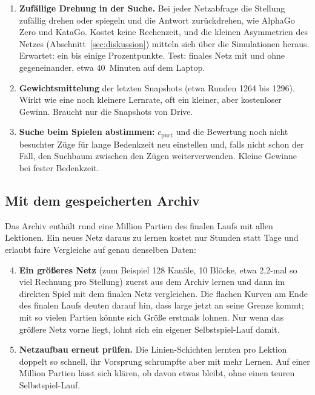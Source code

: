 \documentclass[11pt,a4paper]{article}
\begin{document}
\begin{enumerate}
\item \textbf{Zufällige Drehung in der Suche.} Bei jeder Netzabfrage die Stellung zufällig drehen oder
spiegeln und die Antwort zurückdrehen, wie AlphaGo Zero und KataGo. Kostet keine Rechenzeit, und die
kleinen Asymmetrien des Netzes (Abschnitt~\ref{sec:diskussion}) mitteln sich über die Simulationen heraus.
Erwartet: ein bis einige Prozentpunkte. Test: finales Netz mit und ohne gegeneinander, etwa
40~Minuten auf dem Laptop.
\item \textbf{Gewichtsmittelung} der letzten Snapshots (etwa Runden 1264 bis 1296). Wirkt wie eine noch
kleinere Lernrate, oft ein kleiner, aber kostenloser Gewinn. Braucht nur die Snapshots von Drive.
\item \textbf{Suche beim Spielen abstimmen:} $c_\text{puct}$ und die Bewertung noch nicht besuchter Züge
für lange Bedenkzeit neu einstellen und, falls nicht schon der Fall, den Suchbaum zwischen den Zügen
weiterverwenden. Kleine Gewinne bei fester Bedenkzeit.
\end{enumerate}

\subsection{Mit dem gespeicherten Archiv}

Das Archiv enthält rund eine Million Partien des finalen Laufs mit allen Lektionen. Ein neues Netz daraus
zu lernen kostet nur Stunden statt Tage und erlaubt faire Vergleiche auf genau denselben Daten:

\begin{enumerate}\setcounter{enumi}{3}
\item \textbf{Ein größeres Netz} (zum Beispiel 128 Kanäle, 10 Blöcke, etwa 2{,}2-mal so viel Rechnung pro
Stellung) zuerst aus dem Archiv lernen und dann im direkten Spiel mit dem finalen Netz vergleichen. Die
flachen Kurven am Ende des finalen Laufs deuten darauf hin, dass large jetzt an seine Grenze kommt; mit
so vielen Partien könnte sich Größe erstmals lohnen. Nur wenn das größere Netz vorne liegt, lohnt sich ein
eigener Selbstspiel-Lauf damit.
\item \textbf{Netzaufbau erneut prüfen.} Die Linien-Schichten lernten pro Lektion doppelt so schnell, ihr
Vorsprung schrumpfte aber mit mehr Lernen. Auf einer Million Partien lässt sich klären, ob davon etwas
bleibt, ohne einen teuren Selbstspiel-Lauf.
\end{enumerate}
\end{document}
